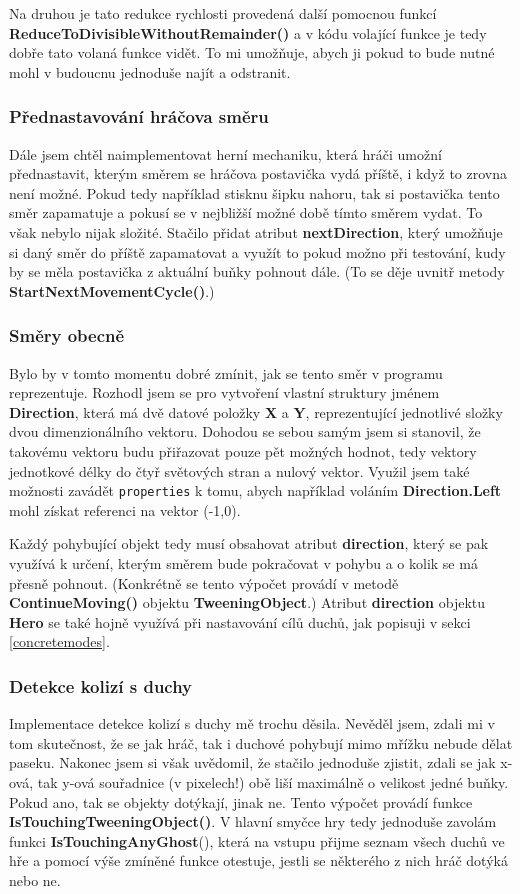 \documentclass[a4]{article}
\begin{document}
Na druhou je tato redukce rychlosti provedená další pomocnou funkcí \textbf{ReduceToDivisibleWithoutRemainder()} a v kódu volající funkce je tedy dobře tato volaná funkce vidět. To mi umožňuje, abych ji pokud to bude nutné mohl v budoucnu jednoduše najít a odstranit.

\subsubsection{Přednastavování hráčova směru}
Dále jsem chtěl naimplementovat herní mechaniku, která hráči umožní přednastavit, kterým směrem se hráčova postavička vydá příště, i když to zrovna není možné. Pokud tedy například stisknu šipku nahoru, tak si postavička tento směr zapamatuje a pokusí se v nejbližší možné době tímto směrem vydat. To však nebylo nijak složité. Stačilo přidat atribut \textbf{nextDirection}, který umožňuje si daný směr do příště zapamatovat a využít to pokud možno při testování, kudy by se měla postavička z aktuální buňky pohnout dále. (To se děje uvnitř metody \textbf{StartNextMovementCycle()}.)

\subsubsection{Směry obecně} \label{directions}
Bylo by v tomto momentu dobré zmínit, jak se tento směr v programu reprezentuje. Rozhodl jsem se pro vytvoření vlastní struktury jménem \textbf{Direction}, která má dvě datové položky \textbf{X} a \textbf{Y}, reprezentující jednotlivé složky dvou dimenzionálního vektoru. Dohodou se sebou samým jsem si stanovil, že takovému vektoru budu přiřazovat pouze pět možných hodnot, tedy vektory jednotkové délky do čtyř světových stran a nulový vektor. Využil jsem také možnosti zavádět \verb|properties| k tomu, abych například voláním \textbf{Direction.Left} mohl získat referenci na vektor (-1,0).

Každý pohybující objekt tedy musí obsahovat atribut \textbf{direction}, který se pak využívá k určení, kterým směrem bude pokračovat v pohybu a o kolik se má přesně pohnout. (Konkrétně se tento výpočet provádí v metodě \textbf{ContinueMoving()} objektu \textbf{TweeningObject}.) Atribut \textbf{direction} objektu \textbf{Hero} se také hojně využívá při nastavování cílů duchů, jak popisuji v sekci \ref{concretemodes}.

\subsubsection{Detekce kolizí s duchy} \label{collisiondetection}
Implementace detekce kolizí s duchy mě trochu děsila. Nevěděl jsem, zdali mi v tom skutečnost, že se jak hráč, tak i duchové pohybují mimo mřížku nebude dělat paseku. Nakonec jsem si však uvědomil, že stačilo jednoduše zjistit, zdali se jak x-ová, tak y-ová souřadnice (v pixelech!) obě liší maximálně o velikost jedné buňky. Pokud ano, tak se objekty dotýkají, jinak ne. Tento výpočet provádí funkce \textbf{IsTouchingTweeningObject()}. V hlavní smyčce hry tedy jednoduše zavolám funkci \textbf{IsTouchingAnyGhost}(), která na vstupu přijme seznam všech duchů ve hře a pomocí výše zmíněné funkce otestuje, jestli se některého z nich hráč dotýká nebo ne.
\end{document}
